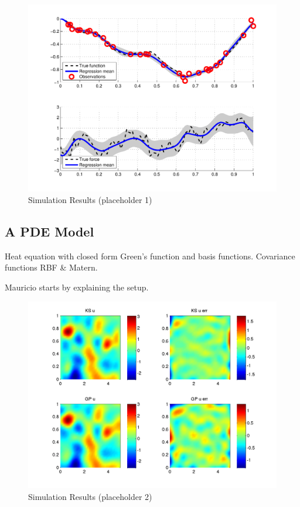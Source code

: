\documentclass[journal]{IEEEtran}
\newcommand{\simo}[1]{{\color{red}#1}}
\begin{document}
\begin{figure}[!t]
\centering
\includegraphics[width=\columnwidth]{placeholder1}
\caption{Simulation Results (placeholder 1)}
\label{fig_sim}
\end{figure}


\subsection{A PDE Model}
%
\simo{Heat equation with closed form Green's function and basis functions. Covariance functions RBF \& Matern.}

\simo{Mauricio starts by explaining the setup.}

\begin{figure}[!t]
\centering
\includegraphics[width=\columnwidth]{placeholder2}
\caption{Simulation Results (placeholder 2)}
\label{fig_sim}
\end{figure}
\end{document}
